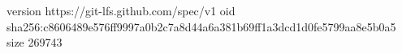 version https://git-lfs.github.com/spec/v1
oid sha256:c8606489e576ff9997a0b2c7a8d44a6a381b69ff1a3dcd1d0fe5799aa8e5b0a5
size 269743
